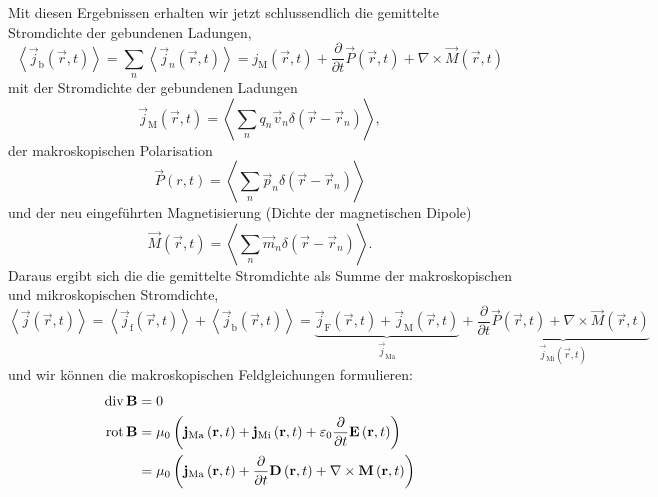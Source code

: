 Mit diesen Ergebnissen erhalten wir jetzt schlussendlich die gemittelte Stromdichte der gebundenen Ladungen,
\begin{equation*}
	\left\langle \vec {j}_{\mathrm{b}}\left(\vec {r},t\right)\right\rangle =\sum _{n}\left\langle \vec {j}_{n}\left(\vec {r},t\right)\right\rangle =j_{\mathrm{M}}\left(\vec {r},t\right)+\frac{\partial }{\partial t}\vec {P}\left(\vec {r},t\right)+\nabla \times \vec {M}\left(\vec {r},t\right)
\end{equation*}
mit der Stromdichte der gebundenen Ladungen
\begin{equation*}
	\vec {j}_{\mathrm{M}}\left(\vec {r},t\right)=\left\langle \sum _{n}q_{n}\vec {v}_{n}\delta \left(\vec {r}-\vec {r}_{n}\right)\right\rangle ,
\end{equation*}
der makroskopischen Polarisation
\begin{equation*}
	\vec {P}\left(r,t\right)=\left\langle \sum _{n}\vec {p}_{n}\delta \left(\vec {r}-\vec {r}_{n}\right)\right\rangle
\end{equation*}
und der neu eingeführten Magnetisierung (Dichte der magnetischen Dipole)
\begin{equation*}
	\vec {M}\left(\vec {r},t\right)=\left\langle \sum _{n}\vec {m}_{n}\delta \left(\vec {r}-\vec {r}_{n}\right)\right\rangle .
\end{equation*}
Daraus ergibt sich die die gemittelte Stromdichte als Summe der makroskopischen und mikroskopischen Stromdichte,
\begin{equation*}
	\left\langle \vec {j}\left(\vec {r},t\right)\right\rangle =\left\langle \vec {j}_{\mathrm{f}}\left(\vec {r},t\right)\right\rangle +\left\langle \vec {j}_{\mathrm{b}}\left(\vec {r},t\right)\right\rangle =\underset{\vec {j}_{\mathrm{Ma}}}{\underbrace{\vec {j}_{\mathrm{F}}\left(\vec {r},t\right)+\vec {j}_{\mathrm{M}}\left(\vec {r},t\right)}}+\underset{\vec {j}_{\mathrm{Mi}}\left(\vec {r},t\right)}{\underbrace{\frac{\partial }{\partial t}\vec {P}\left(\vec {r},t\right)+\nabla \times \vec {M}\left(\vec {r},t\right)}}
\end{equation*}
und wir können die makroskopischen Feldgleichungen formulieren:
\begin{align*}
	\operatorname{div} \mathbf{B} & =0                                                                                                                                                                                            \\
	\operatorname{rot} \mathbf{B}  & =\mu _{0}\left(\mathbf{j}_{\mathrm{Ma}}\left(\mathbf{r},t\right)+\mathbf{j}_{\mathrm{Mi}}\left(\mathbf{r},t\right)+\varepsilon _{0}\frac{\partial }{\partial t}\mathbf{E}\left(\mathbf{r},t\right)\right) \\
	               & =\mu _{0}\left(\mathbf{j}_{\mathrm{Ma}}\left(\mathbf{r},t\right)+\frac{\partial }{\partial t}\mathbf{D}\left(\mathbf{r},t\right)+\nabla \times \mathbf{M}\left(\mathbf{r},t\right)\right)
\end{align*}
